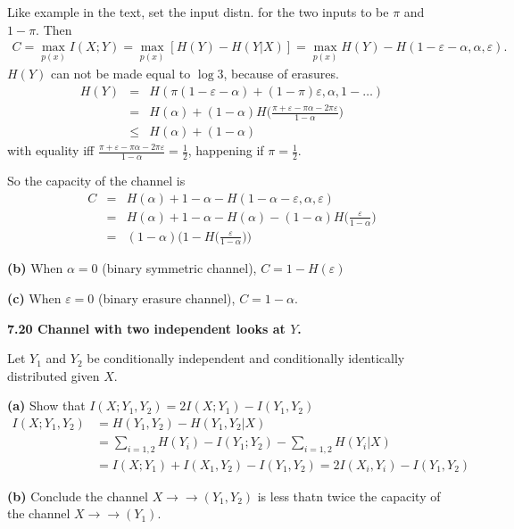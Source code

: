 \documentclass[10pt]{article}
\begin{document}
\begin{tiny}
\begin{multicols}{3}
Like example in the text, set the input distn. for the two inputs to be $\pi$ and $1-\pi$. Then
\begin{align*}
    C = \max_{p(x)}I(X;Y) = \max_{p(x)}[H(Y) - H(Y|X)] = \max_{p(x)}H(Y) - H(1-\varepsilon-\alpha,\alpha,\varepsilon).
\end{align*}
$H(Y)$ can not be made equal to $\log 3$, because of erasures. 
\begin{eqnarray*}
    H(Y) &=& H( \pi(1-\varepsilon-\alpha) + (1-\pi)\varepsilon,\alpha, 1 - \dots)\\ %
    &=& H(\alpha) + (1-\alpha)H\bigg(\frac{\pi+\varepsilon -\pi\alpha-2\pi\varepsilon}{1-\alpha}\bigg) \\
    &\le& H(\alpha) + (1-\alpha)
\end{eqnarray*}
with equality iff $\frac{\pi+\varepsilon -\pi\alpha-2\pi\varepsilon}{1-\alpha} = \frac{1}{2}$, happening if $\pi = \frac{1}{2}$.

So the capacity of the channel is
\begin{eqnarray*}
    C &=& H(\alpha) + 1 - \alpha - H(1-\alpha-\varepsilon,\alpha,\varepsilon) \\
    &=& H(\alpha) + 1 - \alpha - H(\alpha) - (1-\alpha) H\bigg(\frac{\varepsilon}{1-\alpha}\bigg) \\
    &=& (1-\alpha) \bigg(1 - H\bigg(\frac{\varepsilon}{1-\alpha}\bigg)\bigg)
\end{eqnarray*}

\textbf{(b)} When $\alpha = 0$ (binary symmetric channel), $C = 1- H(\varepsilon)$

\textbf{(c)} When $\varepsilon = 0$ (binary erasure channel), $C=1-\alpha$.

\textbf{\scriptsize 7.20 Channel with two independent looks at $Y$.}

Let $Y_1$ and $Y_2$ be conditionally independent and conditionally identically distributed given $X$.

\textbf{(a)} Show that $I(X;Y_1, Y_2) = 2I(X;Y_1) - I(Y_1,Y_2)$
\begin{align*}
    I(X;Y_1,Y_2) &= H(Y_1,Y_2) - H(Y_1,Y_2 | X) \\
    &= \sum_{i=1,2} H(Y_i) - I(Y_1;Y_2) - \sum_{i=1,2} H (Y_i|X) \\
    &= I(X;Y_1) + I(X_1,Y_2) - I(Y_1,Y_2) = 2I(X_i,Y_i) - I(Y_1,Y_2)
\end{align*}

\textbf{(b)} Conclude the channel $X\rightarrow\rightarrow(Y_1,Y_2)$ is less thatn twice the capacity of the channel $X\rightarrow\rightarrow(Y_1)$.


\end{multicols}
\end{tiny}
\end{document}
